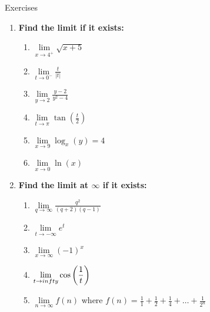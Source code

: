 \documentclass[../revisedMain.tex]{subfiles}
\begin{document}
\begin{center}
	{\Large Exercises}
\end{center}
\begin{enumerate}
	\item \textbf{Find the limit if it exists:}
	\begin{enumerate}
		\item $\lim\limits_{x\to 4^+}\displaystyle\sqrt{x+5}$
		\item $\lim\limits_{t\to 0^-}\displaystyle\frac{t}{\left| t \right|}$
		\item $\lim\limits_{y\to 2}\displaystyle\frac{y-2}{y^2-4}$
		\item $\lim\limits_{t\to \pi}\displaystyle\tan\left(\displaystyle\frac{t}{2}\right)$
		\item $\lim\limits_{x\to 9}\log_x(y)=4$
		\item $\lim\limits_{x\to 0}\ln(x)$
	\end{enumerate}
	\item \textbf{Find the limit at $\infty$ if it exists:}
	\begin{enumerate}
		\item $\lim\limits_{q\to\infty}\displaystyle\frac{q^2}{(q+2)(q-1)}$
		\item $\lim\limits_{t\to-\infty}e^t$
		\item $\lim\limits_{x\to\infty}(-1)^x$
		\item $\lim\limits_{t\to\-infty}\cos\left(\displaystyle\frac{1}{t}\right)$
		\item $\lim\limits_{n\to\infty}f(n)$ where $f(n)=\displaystyle\frac{1}{1}+\displaystyle\frac{1}{2}+\displaystyle\frac{1}{4}+\dots+\displaystyle\frac{1}{2^n}$
	\end{enumerate}
\end{enumerate}
\end{document}
